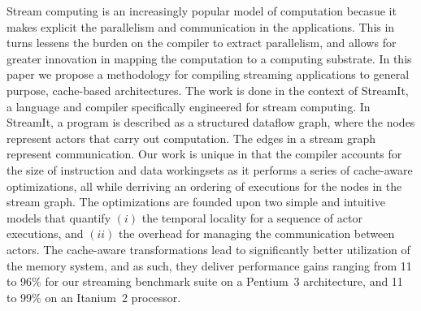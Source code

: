 
Stream computing is an increasingly popular model of computation
becasue it makes explicit the parallelism and communication in the
applications. This in turns lessens the burden on the compiler to
extract parallelism, and allows for greater innovation in mapping the
computation to a computing substrate. In this paper we propose a
methodology for compiling streaming applications to general purpose,
cache-based architectures. The work is done in the context of
StreamIt, a language and compiler specifically engineered for stream
computing. In StreamIt, a program is described as a structured dataflow
graph, where the nodes represent actors that carry out 
computation. The edges in a stream graph represent
communication. Our work is unique in that the compiler
accounts for the size of instruction and data workingsets as it
performs a series of cache-aware optimizations, all while derriving an
ordering of executions for the nodes in the stream graph. The
optimizations are founded upon two simple and intuitive models that
quantify $(i)$ the temporal locality for a sequence of  actor
executions, and $(ii)$ the overhead for managing the communication
between actors. The cache-aware transformations lead to significantly
better utilization of the memory system, and as such, they deliver
performance gains ranging from 11 to 96\% for our streaming
benchmark suite on a Pentium~3 architecture, and 11 to 99\% on an
Itanium~2 processor.

